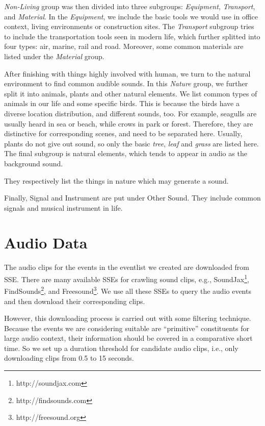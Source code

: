 \textit{Non-Living} group was then divided into three subgroups: \textit{Equipment}, \textit{Transport}, and \textit{Material}. 
In the \textit{Equipment}, we include the basic tools we would use in office context, living environments or construction sites. 
The \textit{Transport} subgroup tries to include the transportation tools seen in modern life, which further splitted into four types: air, marine, rail and road. 
Moreover, some common materials are listed under the \textit{Material} group. 

After finishing with things highly involved with human, we turn to the natural environment to find common audible sounds. 
In this \textit{Nature} group, we further split it into animals, plants and other natural elements. 
We list common types of animals in our life and some specific birds. 
This is because the birds have a diverse location distribution, and different sounds, too. 
For example, seagulls are usually heard in sea or beach, while crows in park or forest. 
Therefore, they are distinctive for corresponding scenes, and need to be separated here. 
Usually, plants do not give out sound, so only the basic \textit{tree}, \textit{leaf} and \textit{grass} are listed here. 
The final subgroup is natural elements, which tends to appear in audio as the background sound.  


They respectively list the things in nature which may generate a sound. 

Finally, Signal and Instrument are put under Other Sound. 
They include common signals and musical instrument in life. 

\section{Audio Data}
The audio clips for the events in the eventlist we created are downloaded from SSE. 
There are many available SSEs for crawling sound clips, e.g., SoundJax\footnote{http://soundjax.com}, FindSounds\footnote{http://findsounds.com}, and Freesound\footnote{http://freesound.org}. 
We use all these SSEs to query the audio events and then download their corresponding clips. 

However, this downloading process is carried out with some filtering technique. 
Because the events we are considering suitable are ``primitive'' constituents for large audio context, their information should be covered in a comparative short time. 
So we set up a duration threshold for candidate audio clips, i.e., only downloading clips from 0.5 to 15 seconds.  

